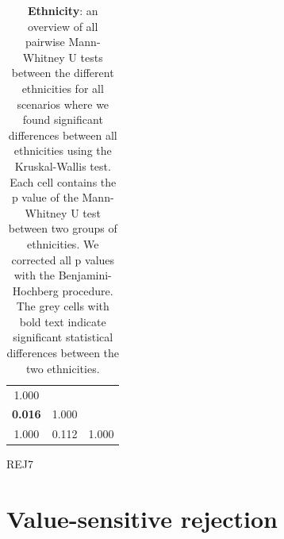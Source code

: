 \begin{table}
\begin{subtable}{.21\textwidth}
\begin{tabular}{ccc}
            \midrule
            1.000                                  &                           &                           \\
            \cellcolor[HTML]{EFEFEF}\textbf{0.016} & \multicolumn{1}{r}{1.000} &                           \\
            1.000                                  & \multicolumn{1}{r}{0.112} & \multicolumn{1}{r}{1.000} \\
            \bottomrule
        \end{tabular}
        \caption{REJ7}
    \end{subtable}
    \caption{\textbf{Ethnicity}: an overview of all pairwise Mann-Whitney U tests between the different ethnicities for all scenarios where we found significant differences between all ethnicities using the Kruskal-Wallis test. Each cell contains the p value of the Mann-Whitney U test between two groups of ethnicities. We corrected all p values with the Benjamini-Hochberg procedure. The grey cells with bold text indicate significant statistical differences between the two ethnicities.}
\end{table}

\section{Value-sensitive rejection}
\label{sec:results-rejector}
